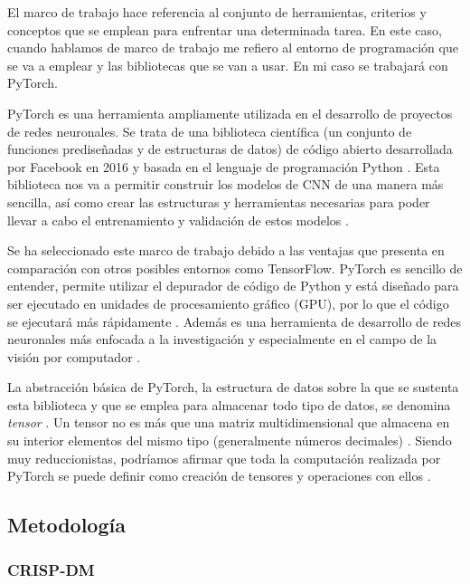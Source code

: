El marco de trabajo hace referencia al conjunto de herramientas, criterios y conceptos que se emplean para enfrentar una determinada tarea. En este caso, cuando hablamos de marco de trabajo me refiero al entorno de programación que se va a emplear y las bibliotecas que se van a usar. En mi caso se trabajará con PyTorch.

PyTorch es una herramienta ampliamente utilizada en el desarrollo de proyectos de redes neuronales. Se trata de una biblioteca científica (un conjunto de funciones prediseñadas y de estructuras de datos) de código abierto desarrollada por Facebook en 2016 y basada en el lenguaje de programación Python \cite{marco:pytorch_libro}. Esta biblioteca nos va a permitir construir los modelos de CNN de una manera más sencilla, así como crear las estructuras y herramientas necesarias para poder llevar a cabo el entrenamiento y validación de estos modelos \cite{marco:pytorch}.

Se ha seleccionado este marco de trabajo debido a las ventajas que presenta en comparación con otros posibles entornos como TensorFlow. PyTorch es sencillo de entender, permite utilizar el depurador de código de Python y está diseñado para ser ejecutado en unidades de procesamiento gráfico (GPU), por lo que el código se ejecutará más rápidamente \cite{marco:pytorch_libro}. Además es una herramienta de desarrollo de redes neuronales más enfocada a la investigación y especialmente en el campo de la visión por computador \cite{marco:pytorch}.

La abstracción básica de PyTorch, la estructura de datos sobre la que se sustenta esta biblioteca y que se emplea para almacenar todo tipo de datos, se denomina \textit{tensor} \cite{marco:pytorch_libro}. Un tensor no es más que una matriz multidimensional que almacena en su interior elementos del mismo tipo (generalmente números decimales) \cite{marco:pytorch_web}. Siendo muy reduccionistas, podríamos afirmar que toda la computación realizada por PyTorch se puede definir como creación de tensores y operaciones con ellos \cite{marco:pytorch_libro}.

\subsection{Metodología}

\subsubsection{CRISP-DM}

